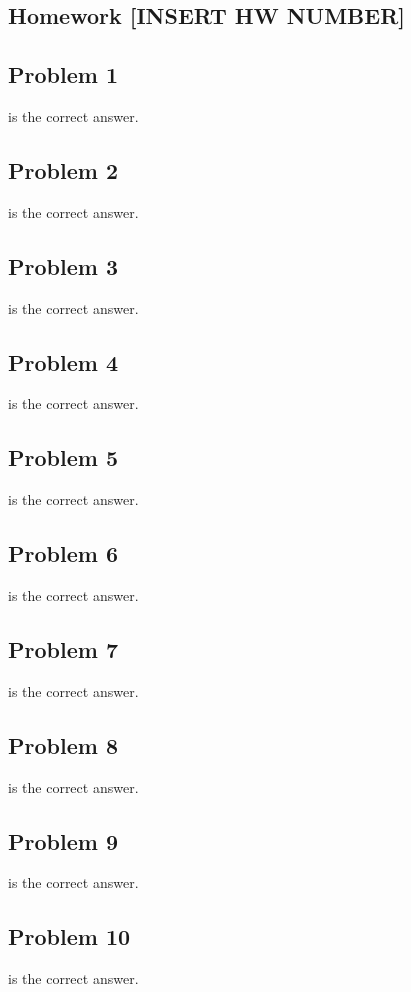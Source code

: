 \documentclass[12 pt]{article}
\begin{document}
	\begin{center}
		\section*{Homework [INSERT HW NUMBER]}
	\end{center}
	
	
	\subsection*{Problem 1}	
	\textbf{} is the correct answer. \\


	
	\subsection*{Problem 2}
	\textbf{} is the correct answer. \\

	
	\subsection*{Problem 3}
	\textbf{} is the correct answer.\\
	
	\subsection*{Problem 4}
	\textbf{} is the correct answer.\\


	\subsection*{Problem 5}
	\textbf{} is the correct answer.\\

		
	\subsection*{Problem 6}
	\textbf{} is the correct answer. \\

		
	\subsection*{Problem 7}
	\textbf{} is the correct answer. \\

		
	
	\subsection*{Problem 8}
	\textbf{} is the correct answer. \\
	

	
	\subsection*{Problem 9}
	\textbf{} is the correct answer. \\

	
	\subsection*{Problem 10}
	\textbf{} is the correct answer. \\

	
\end{document}
